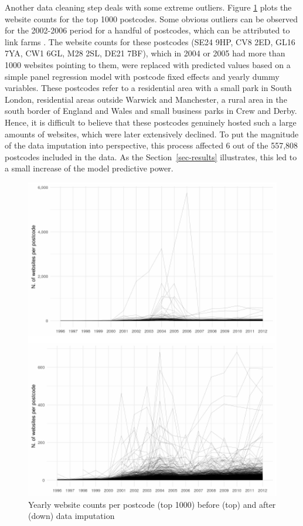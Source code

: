 \documentclass[
  authoryear,
  preprint,
  3p]{elsarticle}
\begin{document}
Another data cleaning step deals with some extreme outliers. Figure
\ref{correct} plots the website counts for the top 1000 postcodes. Some
obvious outliers can be observed for the 2002-2006 period for a handful
of postcodes, which can be attributed to link farms \citep{BL2013links}.
The website counts for these postcodes (SE24 9HP, CV8 2ED, GL16 7YA, CW1
6GL, M28 2SL, DE21 7BF), which in 2004 or 2005 had more than 1000
websites pointing to them, were replaced with predicted values based on
a simple panel regression model with postcode fixed effects and yearly
dummy variables. These postcodes refer to a residential area with a
small park in South London, residential areas outside Warwick and
Manchester, a rural area in the south border of England and Wales and
small business parks in Crew and Derby. Hence, it is difficult to
believe that these postcodes genuinely hosted such a large amounts of
websites, which were later extensively declined. To put the magnitude of
the data imputation into perspective, this process affected 6 out of the
557,808 postcodes included in the data. As the Section~\ref{sec-results}
illustrates, this led to a small increase of the model predictive power.

\begin{figure}[H]

{\centering \includegraphics[width=1\textwidth,height=0.7\textheight]{tranos2023_files/figure-pdf/unnamed-chunk-2-1.pdf}

}

\caption{\label{correct}Yearly website counts per postcode (top 1000)
before (top) and after (down) data imputation}

\end{figure}%
\end{document}
